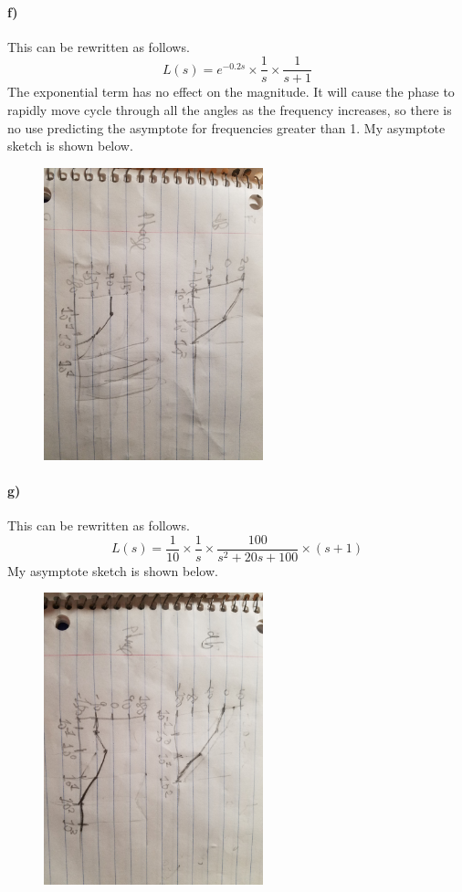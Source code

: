 \documentclass[12pt]{article}
\begin{document}
\paragraph{f)}

This can be rewritten as follows.
\[L(s)=e^{-0.2s}\times\frac{1}{s}\times\frac{1}{s+1}\]
The exponential term has no effect on the magnitude. It will cause the phase to rapidly move cycle through all the angles as the frequency
increases, so there is no use predicting the asymptote for frequencies greater than 1.
My asymptote sketch is shown below.
\begin{figure}[H]
    \begin{center}
        \includegraphics[width=2.5in]{problem1f.jpg}
    \end{center}
\end{figure}

\paragraph{g)}

This can be rewritten as follows.
\[L(s)=\frac{1}{10}\times\frac{1}{s}\times\frac{100}{s^2+20s+100}\times(s+1)\]
My asymptote sketch is shown below.
\begin{figure}[H]
    \begin{center}
        \includegraphics[width=2.5in]{problem1g.jpg}
    \end{center}
\end{figure}
\end{document}
